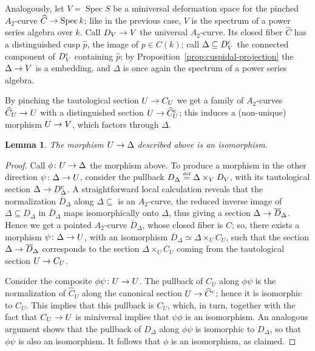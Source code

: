 \documentclass[a4paper, 10pt]{amsart}
\numberwithin{equation}{section}
\numberwithin{subsection}{section}
\newtheorem{lemma}[theorem]{Lemma}
\theoremstyle{definition}
\theoremstyle{remark}
\newcommand\arr{\ifinner\to\else\longrightarrow\fi}
\newcommand{\eqdef}{\mathrel{\smash{\overset{\mathrm{\scriptscriptstyle def}} =}}}
\newcommand\spec{\operatorname{Spec}}
\newcommand{\cu}{^{\rm c}}
\begin{document}
Analogously, let $V = \spec S$ be a miniversal deformation space for the pinched $A_{2}$-curve $\widehat{C} \arr \spec k$; like in the previous case, $V$ is the spectrum of a power series algebra over $k$. Call $D_{V} \arr V$ the universal $A_{2}$-curve. Its closed fiber $\widehat{C}$ has a distinguished cusp $\widehat{p}$, the image of $p \in C(k)$; call $\Delta \subseteq D_{V}\cu$ the connected component of $D_{V}\cu$ containing $\widehat{p}$; by Proposition~\ref{prop:cuspidal-projection} the $\Delta \arr V$ is a embedding, and $\Delta$ is once again the spectrum of a power series algebra.

By pinching the tautological section $U \arr C_{U}$ we get a family of $A_{2}$-curves $\widehat{C}_{U} \arr U$ with a distinguished section $U \arr \widehat{C}_{U}\cu$; this induces a (non-unique) morphism $U \arr V$, which factors through $\Delta$.



\begin{lemma}\label{lem:cuspidal-isomorphism}
The morphism $U \arr \Delta$ described above is an isomorphism.
\end{lemma}

\begin{proof}
Call $\phi\colon U \arr \Delta$ the morphism above. To produce a morphism in the other direction $\psi\colon \Delta \arr U$, consider the pullback $D_{\Delta} \eqdef \Delta\times_{V}D_{V}$, with its tautological section $\Delta \arr D_{\Delta}\cu$. A straightforward local calculation reveals that the normalization $\overline{D}_{\Delta}$ along $\Delta \subseteq$ is an $A_{2}$-curve, the reduced inverse image of $\Delta \subseteq D_{\Delta}$ in $\overline{D}_{\Delta}$ maps isomorphically onto $\Delta$, thus giving a section $\Delta\arr \overline{D}_{\Delta}$. Hence we get a pointed $A_{2}$-curve $\overline{D}_{\Delta}$, whose closed fiber is $C$; so, there exists a morphism $\psi\colon \Delta\arr U$, with an isomorphism $\overline{D}_{\Delta} \simeq \Delta\times_{U}C_{U}$, such that the section $\Delta \arr \overline{D}_{\Delta}$ corresponds to the section $\Delta\times_{U}C_{U}$ coming from the tautological section $U \arr C_{U}$. 

Consider the composite $\phi\psi\colon U \arr U$. The pullback of $C_{U}$ along $\phi\psi$ is the normalization of $\widehat{C}_{U}$ along the canonical section $U \arr \widehat{C}\cu$; hence it is isomorphic to $C_{U}$. This implies that this pullback is $C_{U}$, which, in turn, together with the fact that $C_{U} \arr U$ is miniversal implies that $\psi\phi$ is an isomorphism. An analogous argument shows that the pullback of $D_{\Delta}$ along $\phi\psi$ is isomorphic to $D_{\Delta}$, so that $\phi\psi$ is also an isomorphism. It follows that $\phi$ is an isomorphism, as claimed.
\end{proof}
\end{document}
